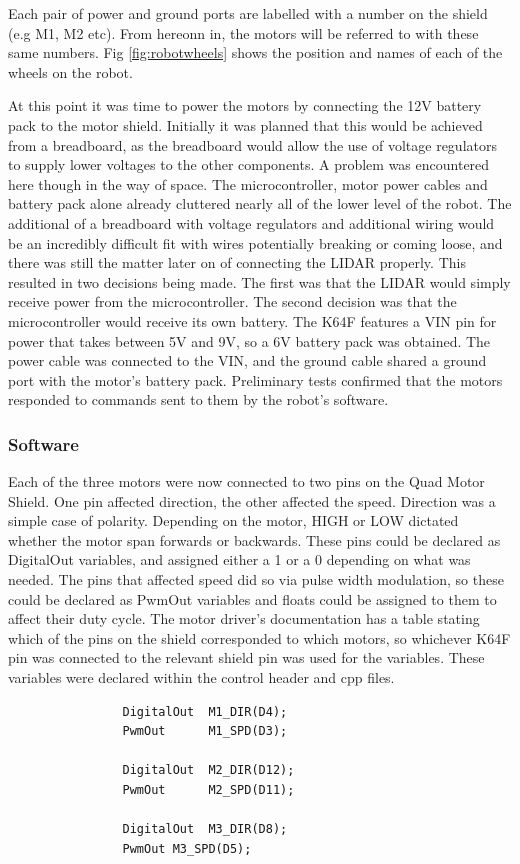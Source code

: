 				Each pair of power and ground ports are labelled with a number on the shield (e.g M1, M2 etc). From hereonn in, the motors will be referred to with these same numbers. Fig \ref{fig:robotwheels} shows the position and names of each of the wheels on the robot.
				
				
				At this point it was time to power the motors by connecting the 12V battery pack to the motor shield. Initially it was planned that this would be achieved from a breadboard, as the breadboard would allow the use of voltage regulators to supply lower voltages to the other components. A problem was encountered here though in the way of space. The microcontroller, motor power cables and battery pack alone already cluttered nearly all of the lower level of the robot. The additional of a breadboard with voltage regulators and additional wiring would be an incredibly difficult fit with wires potentially breaking or coming loose, and there was still the matter later on of connecting the LIDAR properly. This resulted in two decisions being made. The first was that the LIDAR would simply receive power from the microcontroller. The second decision was that the microcontroller would receive its own battery. The K64F features a VIN pin for power that takes between 5V and 9V, so a 6V battery pack was obtained. The power cable was connected to the VIN, and the ground cable shared a ground port with the motor's battery pack. Preliminary tests confirmed that the motors responded to commands sent to them by the robot's software.
				
				\subsubsection{Software}
				\label{req:movement:software}
				Each of the three motors were now connected to two pins on the Quad Motor Shield. One pin affected direction, the other affected the speed. Direction was a simple case of polarity. Depending on the motor, HIGH or LOW dictated whether the motor span forwards or backwards. These pins could be declared as DigitalOut variables, and assigned either a 1 or a 0 depending on what was needed.  The pins that affected speed did so via pulse width modulation, so these could be declared as PwmOut variables and floats could be assigned to them to affect their duty cycle. The motor driver's documentation has a table stating which of the pins on the shield corresponded to which motors, so whichever K64F pin was connected to the relevant shield pin was used for the variables. These variables were declared within the control header and cpp files.
				\begin{lstlisting}
				DigitalOut  M1_DIR(D4);
				PwmOut      M1_SPD(D3);
				
				DigitalOut  M2_DIR(D12);
				PwmOut      M2_SPD(D11);
				
				DigitalOut  M3_DIR(D8);
				PwmOut M3_SPD(D5);
				\end{lstlisting}
				
